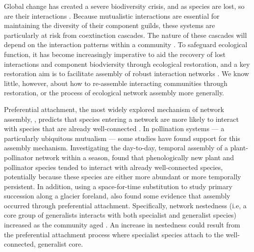\documentclass[12pt]{article}
\begin{document}
Global change has created a severe biodiversity crisis, and as species
are lost, so are their interactions \citep{dunn2009sixth,
  barnosky2011has}. Because mutualistic interactions are essential for
maintaining the diversity of their component guilds, these systems are
particularly at risk from coextinction cascades. The nature of these
cascades will depend on the interaction patterns within a community
\citep{Memmott2004, Rezende2007, Bascompte2009, Thebault2010}. To
safeguard ecological function, it has become increasingly imperative
to aid the recovery of lost interactions and component biodviersity
through ecological restoration, and a key restoration aim is to
facilitate assembly of robust interaction networks
\citep{menz-2010-4}. We know little, however, about how to re-assemble
interacting communities through restoration, or the process of
ecological network assembly more generally.

Preferential attachment, the most widely explored mechanism of network
assembly, \citep{barabasi1999emergence}, predicts that species
entering a network are more likely to interact with species that are
already well-connected \citep[the ``rich-get-richer''
principle,][]{barabasi1999emergence}. In pollination systems --- a
particularly ubiquitous mutualism \citep{ollerton-2011-321,
  klein-2007-303} --- some studies have found support for this
assembly mechanism. Investigating the day-to-day, temporal assembly of
a plant-pollinator network within a season, \cite{Olesen2008} found
that phenologically new plant and pollinator species tended to
interact with already well-connected species, potentially because
these species are either more abundant or more temporally
persistent. In addition, using a space-for-time substitution to study
primary succession along a glacier foreland, \cite{albrecht2010plant}
also found some evidence that assembly occurred through preferential
attachment. Specifically, network nestedness (i.e, a core group of
generalists interacts with both specialist and generalist species)
increased as the community aged \citep{albrecht2010plant}.  An
increase in nestedness could result from the preferential attachment
process where specialist species attach to the well-connected,
generalist core.
\end{document}
